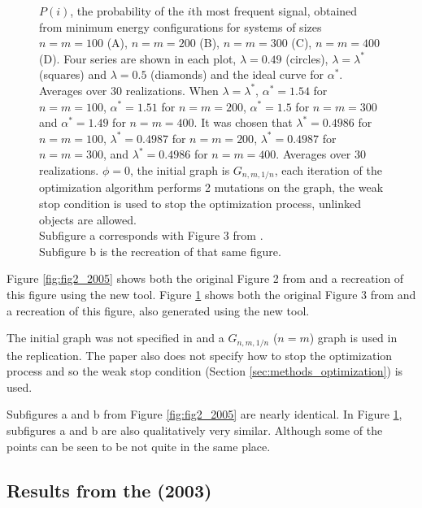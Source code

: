 \begin{figure}
  \caption{
    $P(i)$, the probability of the $i$th most frequent signal, obtained from minimum energy configurations for systems of sizes $n=m=100$ (A), $n=m=200$ (B), $n=m=300$ (C), $n=m=400$ (D).
    Four series are shown in each plot, $\lambda=0.49$ (circles), $\lambda=\lambda^*$ (squares) and $\lambda=0.5$ (diamonds) and the ideal curve for $\alpha^*$.
    Averages over 30 realizations.
    When $\lambda=\lambda^*$, $\alpha^* = 1.54$ for $n=m=100$, $\alpha^* = 1.51$ for $n=m=200$, $\alpha^* = 1.5$ for $n=m=300$ and $\alpha^* = 1.49$ for $n=m=400$.
    It was chosen that $\lambda^* = 0.4986$ for $n=m=100$, $\lambda^* = 0.4987$ for $n=m=200$, $\lambda^* = 0.4987$ for $n=m=300$, and $\lambda^* = 0.4986$ for $n=m=400$.
    Averages over 30 realizations.
    $\phi=0$, the initial graph is $G_{n,m,1/n}$, each iteration of the optimization algorithm performs 2 mutations on the graph, the weak stop condition is used to stop the optimization process, unlinked objects are allowed.\\
    Subfigure a corresponds with Figure 3 from \cite{Ferrer2005a}.\\
    Subfigure b is the recreation of that same figure.
  }
  \label{fig:fig3_2005}
\end{figure}

Figure \ref{fig:fig2_2005} shows both the original Figure 2 from \cite{Ferrer2005a} and a recreation of this figure using the new tool.
Figure \ref{fig:fig3_2005} shows both the original Figure 3 from \cite{Ferrer2005a} and a recreation of this figure, also generated using the new tool.

The initial graph was not specified in \cite{Ferrer2005a} and a $G_{n,m,1/n}$ ($n=m$) graph is used in the replication.
The paper also does not specify how to stop the optimization process and so the weak stop condition (Section \ref{sec:methods_optimization}) is used.

Subfigures a and b from Figure \ref{fig:fig2_2005} are nearly identical.
In Figure \ref{fig:fig3_2005}, subfigures a and b are also qualitatively very similar.
Although some of the points can be seen to be not quite in the same place.

\subsection{Results from the \secondmodel{} (2003)}
\label{sec:results_verification_second}

